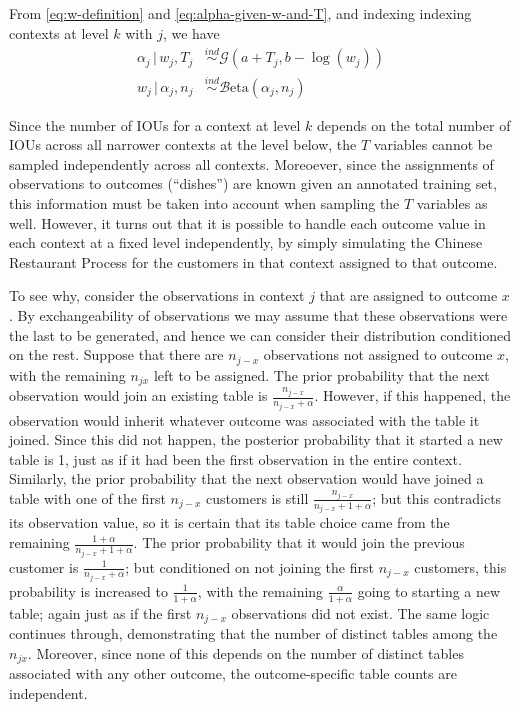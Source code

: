 \documentclass[12pt,letterpaper]{report}
\newcommand{\Gamm}[2]{\mathcal{G}(#1,#2)}
\newcommand{\Beta}[2]{\mathcal{B}\mathrm{eta}(#1,#2)}
\newcommand{\given}{\, \vert \,}
\begin{document}
From \eqref{eq:w-definition} and \eqref{eq:alpha-given-w-and-T}, and indexing
indexing contexts at level $k$ with $j$, we have
\begin{align}
  \alpha_j \given w_j, T_j &\stackrel{ind}{\sim} \Gamm{a + T_j}{b - \log(w_j)} \\
  w_j \given \alpha_j, n_j &\stackrel{ind}{\sim} \Beta{\alpha_j}{n_j}
\end{align}

Since the number of IOUs for a context at level $k$ depends on the
total number of IOUs across all narrower contexts at the level below,
the $T$ variables cannot be sampled independently across all
contexts.  Moreoever, since the assignments of observations to outcomes
(``dishes'') are known given an annotated training set, this
information must be taken into account when sampling the $T$ variables
as well.  However, it turns out that it is possible to handle each outcome
value in each context at a fixed level independently, by simply
simulating the Chinese Restaurant Process for the customers in that
context assigned to that outcome.  

To see why, consider the
observations in context $j$ that are assigned to outcome $x$.
By exchangeability of observations we may assume that these observations were the last
to be generated, and hence we can consider their distribution
conditioned on the rest.  Suppose that there are $n_{j-x}$ observations
not assigned to outcome $x$, with the remaining $n_{jx}$ left to be
assigned.  The prior probability that the next
observation would join an existing table is $\frac{n_{j-x}}{n_{j-x} + \alpha}$.
However, if this happened, the observation would inherit whatever
outcome was associated with the table it joined.  Since this did not
happen, the posterior probability that it started a new table is 1,
just as if it had been the first observation in the entire context.  Similarly, the
prior probability that the next observation would have joined a table with
one of the first $n_{j-x}$ customers is still $\frac{n_{j-x}}{n_{j-x}
  + 1 + \alpha}$; but this contradicts its observation value, so it is
certain that its table choice came from the remaining
$\frac{1 + \alpha}{n_{j-x} + 1 + \alpha}$.  The prior
probability that it would join the previous customer is
$\frac{1}{n_{j-x} + \alpha}$; but conditioned on not joining the
first $n_{j-x}$ customers, this probability is increased to
$\frac{1}{1 + \alpha}$, with the remaining $\frac{\alpha}{1+\alpha}$
going to starting a new table; again just as if the first $n_{j-x}$
observations did not exist.  The same logic continues through,
demonstrating that the number of distinct tables among the $n_{jx}$.
Moreover, since none of this depends on the number of distinct tables
associated with any other outcome, the outcome-specific table counts
are independent.
\end{document}
